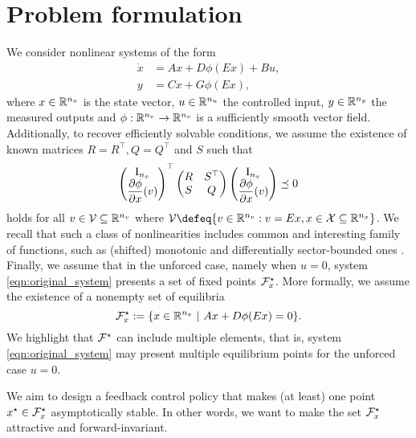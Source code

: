 \documentclass{ifacconf}
\begin{document}
\section{Problem formulation}
We consider nonlinear systems of the form
\begin{equation}\label{eqn:original_system}
\begin{aligned}
\dot x &=   A x  + D\phi(Ex) + Bu,  \\
 y&= Cx+ G\phi(Ex),
\end{aligned}
\end{equation}
where $x\in{\mathbb{R}}^{n_x}$ is the state vector,  $u\in{\mathbb{R}}^{n_u}$ the controlled input, $y\in{\mathbb{R}}^{n_y}$ the measured outputs and $\phi:{\mathbb{R}}^{n_v}\to{\mathbb{R}}^{n_v}$ is a sufficiently smooth vector field. Additionally, to recover efficiently solvable conditions, we assume the existence of known matrices $R=R^\top, Q=Q^\top$ and $S$ such that 
\begin{equation}\label{eqn:generic_abstraction}
    \left(\begin{matrix}\operatorname{I}_{n_x}\\\dfrac{\partial \phi}{\partial x}(v)\end{matrix}\right)^\top\left(\begin{matrix}R&S^\top\\S&Q\end{matrix}\right)\left(\begin{matrix}\operatorname{I}_{n_x}\\\dfrac{\partial \phi}{\partial x}(v)\end{matrix}\right)\preceq 0 
\end{equation}
holds for all $v\in{\mathcal{V}}\subseteq {\mathbb{R}}^{n_v}$ where $\cV\defeq\{v\in\RR^{n_v}:v=E x, x\in\cX\subseteq \RR^{n_x}\}$. We recall that such a class of nonlinearities includes common and interesting family of functions, such as (shifted) monotonic and differentially sector-bounded ones \citep{zoboli2024quadratic}. 
Finally, we assume that in the unforced case, namely when $u=0$, system \eqref{eqn:original_system} presents a set of fixed points ${\mathcal{F}}_x^\star$. More formally, we assume the existence of a nonempty set of equilibria
\begin{equation}\label{eqn:eq_points}
 {\mathcal{F}}_x^\star := \{x\in{\mathbb{R}}^{n_x} \ | \ Ax+D\phi(E x)= 0\}.
\end{equation}
We highlight that ${\mathcal{F}}^\star$ can include multiple elements, that is, system \eqref{eqn:original_system}  may present multiple equilibrium points for the unforced case $u=0$. 

We aim to design a feedback control policy that makes (at least) one point $x^\star\in{\mathcal{F}}_x^\star$ asymptotically stable. In other words, we want to make the set ${\mathcal{F}}_x^\star$ attractive and forward-invariant. 
\end{document}

